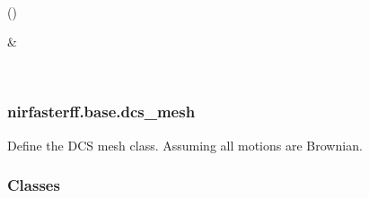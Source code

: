 \documentclass[letterpaper,10pt,english]{sphinxmanual}
\begin{document}
\begin{fulllineitems}
\begin{savenotes}
\begin{longtable}{}
\sphinxbottomrule
{}\\
\endfoot

\endlastfoot
\sphinxtableatstartofbodyhook
\begin{varwidth}[t]{}
\sphinxAtStartPar
{\hyperref[\detokenize{_autosummary/nirfasterff.base.data.meshvol:nirfasterff.base.data.meshvol.__init__}]{}}()
\sphinxbeforeendvarwidth
\end{varwidth}%
&\begin{varwidth}[t]{}
\sphinxAtStartPar

\sphinxbeforeendvarwidth
\end{varwidth}%
\\
\sphinxbottomrule
\end{longtable}
\sphinxtableafterendhook
\sphinxatlongtableend
\end{savenotes}

\end{fulllineitems}


\sphinxstepscope


\subsubsection{nirfasterff.base.dcs\_mesh}
\label{\detokenize{_autosummary/nirfasterff.base.dcs_mesh:module-nirfasterff.base.dcs_mesh}}\label{\detokenize{_autosummary/nirfasterff.base.dcs_mesh:nirfasterff-base-dcs-mesh}}\label{\detokenize{_autosummary/nirfasterff.base.dcs_mesh::doc}}
\sphinxAtStartPar
Define the DCS mesh class. Assuming all motions are Brownian.
\subsubsection*{Classes}
\end{document}
